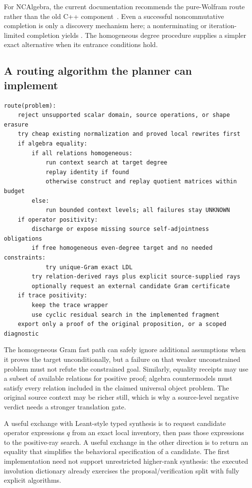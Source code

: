 For NCAlgebra, the current documentation recommends the pure-Wolfram
 route rather than the old C++ component~\cite{ncalgebra}. Even a
successful noncommutative completion is only a discovery mechanism here; a
nonterminating or iteration-limited completion yields \unknown{}. The
homogeneous degree procedure supplies a simpler exact alternative when its
entrance conditions hold.

\subsection{A routing algorithm the planner can implement}

\begin{lstlisting}
route(problem):
    reject unsupported scalar domain, source operations, or shape erasure
    try cheap existing normalization and proved local rewrites first
    if algebra equality:
        if all relations homogeneous:
            run context search at target degree
            replay identity if found
            otherwise construct and replay quotient matrices within budget
        else:
            run bounded context levels; all failures stay UNKNOWN
    if operator positivity:
        discharge or expose missing source self-adjointness obligations
        if free homogeneous even-degree target and no needed constraints:
            try unique-Gram exact LDL
        try relation-derived rays plus explicit source-supplied rays
        optionally request an external candidate Gram certificate
    if trace positivity:
        keep the trace wrapper
        use cyclic residual search in the implemented fragment
    export only a proof of the original proposition, or a scoped diagnostic
\end{lstlisting}

The homogeneous Gram fast path can safely ignore additional assumptions when it
proves the target unconditionally, but a failure on that weaker unconstrained
problem must not refute the constrained goal. Similarly, equality receipts may
use a subset of available relations for positive proof; algebra countermodels
must satisfy every relation included in the claimed universal object problem.
The original source context may be richer still, which is why a source-level
negative verdict needs a stronger translation gate.

A useful exchange with Leant-style typed synthesis is to request candidate
operator expressions $q$ from an exact local inventory, then pass those
expressions to the positive-ray search. A useful exchange in the other direction
is to return an equality that simplifies the behavioral specification of a
candidate. The first implementation need not support unrestricted higher-rank
synthesis: the executed involution dictionary already exercises the
proposal/verification split with fully explicit algorithms.


